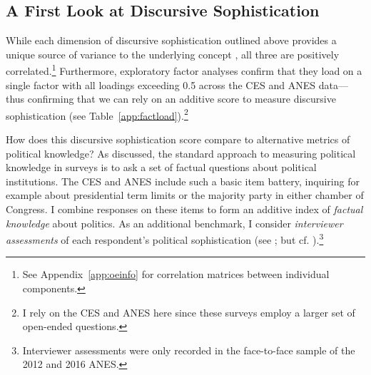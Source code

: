 \subsection*{A First Look at Discursive Sophistication}

While each dimension of discursive sophistication outlined above provides a unique source of variance to the underlying concept \citep{luskin1987measuring}, all three are positively correlated.\footnote{See Appendix~\ref{app:oeinfo} for correlation matrices between individual components.} Furthermore, exploratory factor analyses confirm that they load on a single factor with all loadings exceeding 0.5 across the CES and ANES data---thus confirming that we can rely on an additive score to measure discursive sophistication (see Table~\ref{app:factload}).\footnote{I rely on the CES and ANES here since these surveys employ a larger set of open-ended questions.}



How does this discursive sophistication score compare to alternative metrics of political knowledge? As discussed, the standard approach to measuring political knowledge in surveys is to ask a set of factual questions about political institutions. The CES and ANES include such a basic item battery, inquiring for example about presidential term limits or the majority party in either chamber of Congress. I combine responses on these items to form an additive index of \textit{factual knowledge} about politics. As an additional benchmark, I consider \textit{interviewer assessments} of each respondent's political sophistication (see \citealt{bartels2005homer}; but cf. \citealt{ryan2011accuracy}).\footnote{Interviewer assessments were only recorded in the face-to-face sample of the 2012 and 2016 ANES.}

